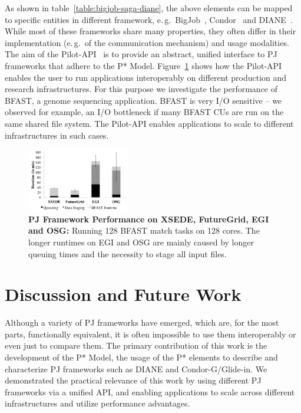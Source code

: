 \documentclass{sig-alt-release2}
\begin{document}
As shown in table~\ref{table:bigjob-saga-diane}, the above elements
can be mapped to specific entities in different \pilotjobs framework,
e.\,g.\ BigJob~\cite{saga_bigjob_condor_cloud_short},
Condor~\cite{condor-g-short} and DIANE~\cite{Moscicki:908910}. While
most of these frameworks share many properties, they often differ in
their implementation (e.\,g.\ of the communication mechanism) and
usage modalities. 
The aim of the Pilot-API~\cite{pilot_api} is to provide an abstract,
unified interface to PJ frameworks that adhere to the P* Model.
Figure~\ref{fig:perf_perf-bfast-bj} shows how the Pilot-API enables
the user to run applications interoperably on different production and
research infrastructures. For this purpose we investigate the
performance of BFAST, a genome sequencing
application. BFAST is very I/O sensitive -- we observed for example,
an I/O bottleneck if many BFAST CUs are run on the same shared file
system. 
The Pilot-API enables applications to scale to different
infrastructures in such cases.

 
\begin{figure}[t]
	\upp
\centering
\includegraphics[width=0.4\textwidth]{perf/interop/128-bfast-egi-fg-xsede-osg.pdf}
\caption{\textbf{PJ Framework Performance on XSEDE, FutureGrid, EGI and 
  OSG:} Running 128 BFAST match tasks on 128 cores. The longer runtimes on EGI 
  and OSG are mainly caused by  longer queuing times and the necessity to   stage all input files. }\upp\upp\upp
  \label{fig:perf_perf-bfast-bj}
\end{figure}


\section{Discussion and Future Work} 
\label{sec:discussion-future-work}

Although a variety of PJ frameworks have emerged, which are, for the
most parts, functionally equivalent, it is often impossible to use
them interoperably or even just to compare them. The primary
contribution of this work is the development of the P* Model, the
usage of the P* elements to describe and characterize PJ frameworks
such as DIANE and Condor-G/Glide-in.  We demonstrated the practical
relevance of this work by using different PJ frameworks via a unified
API, and enabling applications to scale across different
infrastructures and utilize performance advantages.
\end{document}
